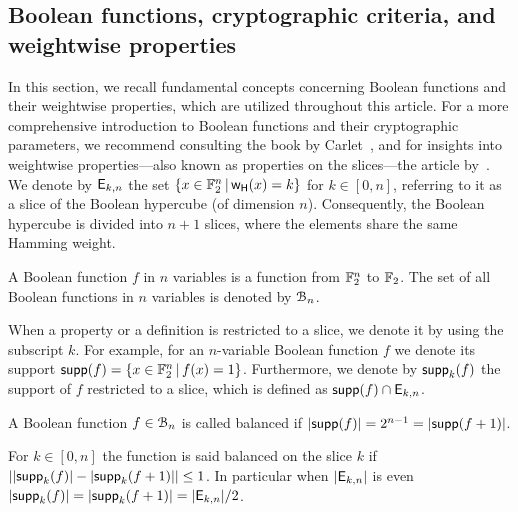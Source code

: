 \documentclass[11pt]{llncs}
\begin{document}
\subsection{Boolean functions, cryptographic criteria, and weightwise properties}
In this section, we recall fundamental concepts concerning Boolean functions and their weightwise properties, which are utilized throughout this article. For a more comprehensive introduction to Boolean functions and their cryptographic parameters, we recommend consulting the book by Carlet~\cite{Carlet20},
and for insights into weightwise properties—also known as properties on the slices—the article by~\cite{TOSC:CarMeaRot17}.
We denote by $\mathsf{E}_{k,n}$ the set $\{x\in \mathbb{F}_2^n \, | \, \mathsf{w_H}(x)=k \}$ for $k \in [0,n]$, referring to it as a slice of the Boolean hypercube (of dimension $n$). 
Consequently, the Boolean hypercube is divided into $n+1$ slices, where the elements share the same Hamming weight.


\begin{definition}\label{def:bool_f}
	A Boolean function $f$ in $n$ variables is a function from $\mathbb{F}_2^n$ to $\mathbb{F}_2$. 
	The set of all Boolean functions in $n$ variables is denoted by $\mathcal{B}_n$.%
\end{definition}


When a property or a definition is restricted to a slice, we denote it by using the subscript $k$. 
For example, for an $n$-variable Boolean function $f$ we denote its support $\mathsf{supp}(f)=\{x\in \mathbb{F}_2^n \, | \, f(x)=1  \}$. 
Furthermore, we denote by $\mathsf{supp}_{k}(f)$ the support of $f$ restricted to a slice, which is defined as $\mathsf{supp}(f)\cap \mathsf{E}_{k,n}$.


\begin{definition}[Balancedness]\label{def:balancedness}
	A Boolean function $f\in \mathcal{B}_n$ is called balanced if $|\mathsf{supp}(f)|=2^{n-1}=|\mathsf{supp}(f+1)|$. 
	
	For $k\in [0,n]$ the function is said balanced on the slice $k$ if $||\mathsf{supp}_{k}(f)|-|\mathsf{supp}_{k}(f+1)| |\le 1$. In particular when $|\mathsf{E}_{k,n}|$ is even $|\mathsf{supp}_{k}(f)|=|\mathsf{supp}_{k}(f+1)|=|\mathsf{E}_{k,n}|/2$.
\end{definition}
\end{document}
